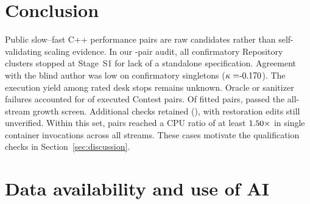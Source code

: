 \documentclass[11pt]{article}
\begin{document}
\section{Conclusion}
\label{sec:conclusion}

Public slow--fast C++ performance pairs are raw candidates rather than self-validating scaling evidence.
In our \BenchPairs{}-pair audit, all \BenchConfRepoClustersN{} confirmatory Repository clusters stopped at Stage~S1 for lack of a standalone specification. Agreement with the blind author was low on confirmatory singletons ($\kappa = \BenchAuthConfBinK{}$). The execution yield among rated desk stops remains unknown. Oracle or sanitizer failures accounted for \BenchOracleFailPct{} of executed Contest pairs. Of \BenchFittedClusters{} fitted pairs, \BenchPThreeCount{} passed the all-stream growth screen. Additional checks retained \BenchCoreFourN{} (\BenchCoreFourPct{}), with restoration edits still unverified. Within this set, \BenchRealizedCpuCoreN{} pairs reached a CPU ratio of at least $1.50{}\times$ in single container invocations across all streams.
These cases motivate the qualification checks in Section~\ref{sec:discussion}.

\section*{Data availability and use of AI}
\end{document}

